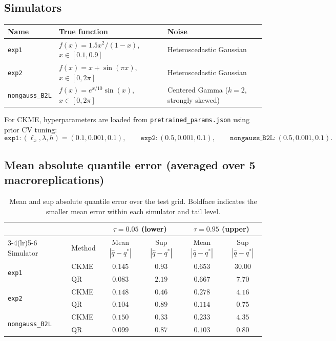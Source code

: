 \documentclass[11pt]{article}
\begin{document}
	\subsection{Simulators}
	
	\begin{center}
		\begin{tabular}{lll}
			\toprule
			Name & True function & Noise \\
			\midrule
			\texttt{exp1}
			& $f(x)=1.5x^2/(1-x)$,\quad $x\in[0.1,0.9]$
			& Heteroscedastic Gaussian \\
			\texttt{exp2}
			& $f(x)=x+\sin(\pi x)$,\quad $x\in[0,2\pi]$
			& Heteroscedastic Gaussian \\
			\texttt{nongauss\_B2L}
			& $f(x)=e^{x/10}\sin(x)$,\quad $x\in[0,2\pi]$
			& Centered Gamma ($k=2$, strongly skewed) \\
			\bottomrule
		\end{tabular}
	\end{center}
	
	For CKME, hyperparameters are loaded from \texttt{pretrained\_params.json}
	using prior CV tuning:
	\[
	\texttt{exp1}: (\ell_x,\lambda,h)=(0.1,0.001,0.1),\qquad
	\texttt{exp2}: (0.5,0.001,0.1),\qquad
	\texttt{nongauss\_B2L}: (0.5,0.001,0.1).
	\]
	
	\subsection{Mean absolute quantile error (averaged over 5 macroreplications)}
	
	\begin{table}[h]
		\centering
		\caption{Mean and sup absolute quantile error over the test grid.
			Boldface indicates the smaller mean error within each simulator and tail level.}
		\begin{tabular}{llcccc}
			\toprule
			& & \multicolumn{2}{c}{$\tau=0.05$ (lower)} &
			\multicolumn{2}{c}{$\tau=0.95$ (upper)} \\
			\cmidrule(lr){3-4}\cmidrule(lr){5-6}
			Simulator & Method & Mean $|\hat{q}-q^*|$ & Sup $|\hat{q}-q^*|$ &
			Mean $|\hat{q}-q^*|$ & Sup $|\hat{q}-q^*|$ \\
			\midrule
			\multirow{2}{*}{\texttt{exp1}}
			& CKME & $0.145$ & $0.93$  & $\mathbf{0.653}$ & $30.00$ \\
			& QR   & $\mathbf{0.083}$ & $2.19$ & $0.667$ & $\mathbf{7.70}$ \\
			\midrule
			\multirow{2}{*}{\texttt{exp2}}
			& CKME & $0.148$ & $0.46$  & $0.278$ & $4.16$ \\
			& QR   & $\mathbf{0.104}$ & $0.89$ & $\mathbf{0.114}$ & $\mathbf{0.75}$ \\
			\midrule
			\multirow{2}{*}{\texttt{nongauss\_B2L}}
			& CKME & $0.150$ & $0.33$  & $0.233$ & $4.35$ \\
			& QR   & $\mathbf{0.099}$ & $0.87$ & $\mathbf{0.103}$ & $\mathbf{0.80}$ \\
			\bottomrule
		\end{tabular}
	\end{table}
	
\end{document}
